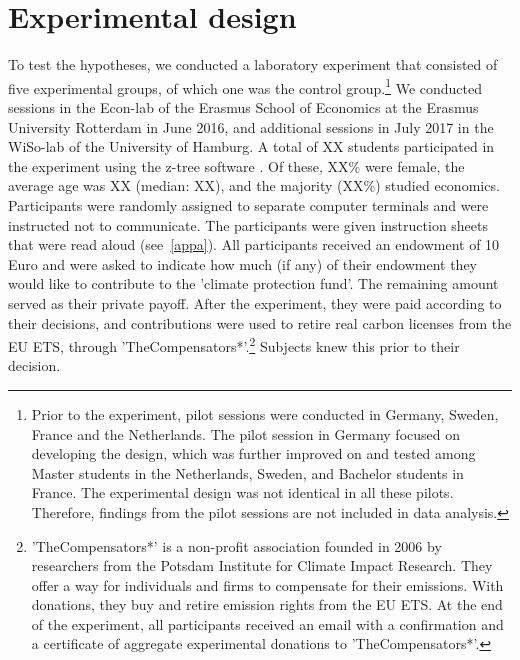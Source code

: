 \documentclass[review, authoryear,12pt]{elsarticle}
\begin{document}
\section{Experimental design}
To test the hypotheses, we conducted a laboratory experiment that consisted of five experimental groups, of which one was the control group.\footnote{Prior to the experiment, pilot sessions were conducted in Germany, Sweden, France and the Netherlands. The pilot session in Germany focused on developing the design, which was further improved on and tested among Master students in the Netherlands, Sweden, and Bachelor students in France. The experimental design was not identical in all these pilots. Therefore, findings from the pilot sessions are not included in data analysis.} We conducted sessions in the Econ-lab of the Erasmus School of Economics at the Erasmus University Rotterdam in June 2016, and additional sessions in July 2017 in the WiSo-lab of the University of Hamburg. 
A total of XX students participated in the experiment using the z-tree software \citep{Fischbacher.2007}. Of these, XX\% were female, the average age was XX (median: XX), and the majority (XX\%) studied economics.
Participants were randomly assigned to separate computer terminals and were instructed not to communicate. The participants were given instruction sheets that were read aloud (see~\ref{appa}). All participants received an endowment of 10 Euro and were asked to indicate how much (if any) of their endowment they would like to contribute to the 'climate protection fund'. The remaining amount served as their private payoff. After the experiment, they were paid according to their decisions, and contributions were used to retire real carbon licenses from the EU ETS, through 'TheCompensators*'.\footnote{'TheCompensators*' is a non-profit association founded in 2006 by researchers from the Potsdam Institute for Climate Impact Research. They offer a way for individuals and firms to compensate for their emissions. With donations, they buy and retire emission rights from the EU ETS. At the end of the experiment, all participants received an email with a confirmation and a certificate of aggregate experimental donations to 'TheCompensators*'.} Subjects knew this prior to their decision.
\end{document}
